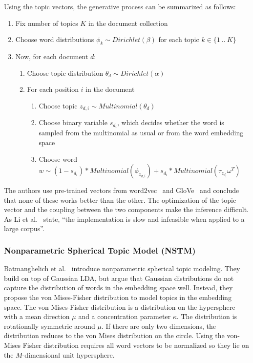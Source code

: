 \documentclass[
        a4paper,
        titlepage,
        twoside,
        parskip,
        numbers=noenddot
        ]{scrbook}
\theoremstyle{break}
\begin{document}
Using the topic vectors, the generative process can be summarized as follows:
\begin{enumerate}
    \item Fix number of topics $K$ in the document collection
    \item Choose word distributions $\phi_k \sim Dirichlet(\beta)$ for each topic $k \in \{1~..~K\}$
    \item Now, for each document $d$:
    \begin{enumerate}
        \item Choose topic distribution $\theta_d \sim Dirichlet(\alpha)$
        \item For each position $i$ in the document
        \begin{enumerate}
            \item Choose topic $z_{d,i} \sim Multinomial(\theta_d)$
            \item Choose binary variable $s_{d_i}$, which decides whether the word is sampled from the multinomial as usual or from the word embedding space
            \item Choose word $w \sim (1 - s_{d_i}) * Multinomial(\phi_{z_{d,i}}) + s_{d_i} * Multinomial(\tau_{z_{d_{i}}} \omega^T)$
        \end{enumerate}
    \end{enumerate}
\end{enumerate}
The authors use pre-trained vectors from word2vec~\cite{Mikolov2013a} and GloVe~\cite{Pennington2014} and conclude that none of these works better than the other.
The optimization of the topic vector and the coupling between the two components make the inference difficult.
As Li et al.~\cite{Li2016} state, ``the implementation is slow and infeasible when applied to a large corpus''.

\subsubsection{Nonparametric Spherical Topic Model (NSTM)}
Batmanghelich et al.~\cite{Batmanghelich2016} introduce nonparametric spherical topic modeling.
They build on top of Gaussian LDA, but argue that Gaussian distributions do not capture the distribution of words in the embedding space well.
Instead, they propose the von Mises-Fisher distribution to model topics in the embedding space.
The von Mises-Fisher distribution is a distribution on the hypersphere with a mean direction $\mu$ and a concentration parameter $\kappa$.
The distribution is rotationally symmetric around $\mu$.
If there are only two dimensions, the distribution reduces to the von Mises distribution on the circle.
Using the von-Mises Fisher distribution requires all word vectors to be normalized so they lie on the $M$-dimensional unit hypersphere.
\end{document}
